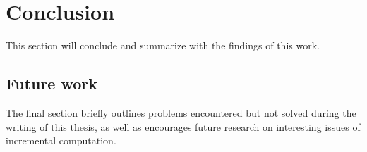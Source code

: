 \section{Conclusion}
This section will conclude and summarize with the findings of this work. 

\subsection{Future work}
The final section briefly outlines problems encountered but not solved during the writing of this thesis, as well as encourages future research on interesting issues of incremental computation.

 